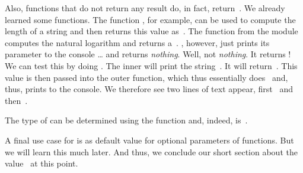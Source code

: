 Also, functions that do not return any result do, in fact, return~.
We already learned some functions.
The function , for example, can be used to compute the length of a string and then returns this value as~.
The function  from the  module computes the natural logarithm and returns a~.
, however, just prints its parameter to the console {\dots} and returns \emph{nothing}.
Well, not \emph{nothing}.
It returns !
We can test this by doing .
The inner  will print the string~.
It will return~.
This value  is then passed into the outer  function, which thus essentially does~ and, thus, prints  to the console.
We therefore see two lines of text appear, first~ and then~.

The type of  can be determined using the  function and, indeed, is~.

A final use case for  is as default value for optional parameters of functions.
But we will learn this much later.
And thus, we conclude our short section about the value~ at this point.%
%
\FloatBarrier%
\endhsection%
%
